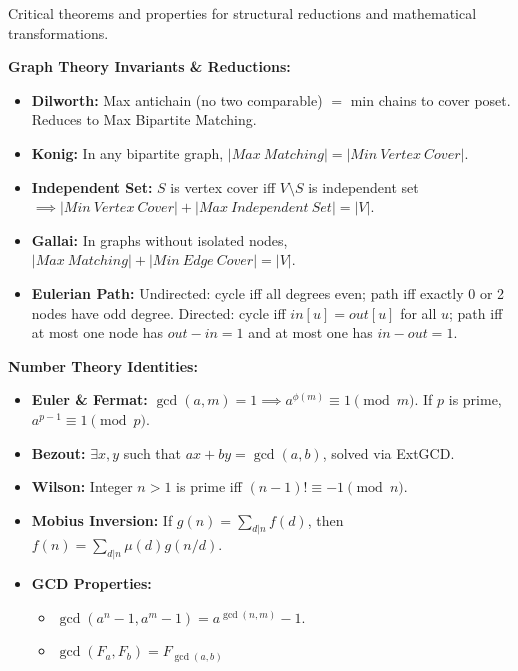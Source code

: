 
Critical theorems and properties for structural reductions and mathematical transformations.

\textbf{Graph Theory Invariants \& Reductions:}
\begin{itemize}
    \item \textbf{Dilworth:} Max antichain (no two comparable) $=$ min chains to cover poset. Reduces to Max Bipartite Matching.
    \item \textbf{Konig:} In any bipartite graph, $|Max\ Matching| = |Min\ Vertex\ Cover|$.
    \item \textbf{Independent Set:} $S$ is vertex cover iff $V \setminus S$ is independent set $\implies |Min\ Vertex\ Cover| + |Max\ Independent\ Set| = |V|$.
    \item \textbf{Gallai:} In graphs without isolated nodes, $|Max\ Matching| + |Min\ Edge\ Cover| = |V|$.
    \item \textbf{Eulerian Path:} Undirected: cycle iff all degrees even; path iff exactly 0 or 2 nodes have odd degree. Directed: cycle iff $in[u]=out[u]$ for all $u$; path iff at most one node has $out-in=1$ and at most one has $in-out=1$.
\end{itemize}

\textbf{Number Theory Identities:}
\begin{itemize}
    \item \textbf{Euler \& Fermat:} $\gcd(a, m) = 1 \implies a^{\phi(m)} \equiv 1 \pmod m$. If $p$ is prime, $a^{p-1} \equiv 1 \pmod p$.
    \item \textbf{Bezout:} $\exists x, y$ such that $ax + by = \gcd(a, b)$, solved via ExtGCD.
    \item \textbf{Wilson:} Integer $n > 1$ is prime iff $(n-1)! \equiv -1 \pmod n$.
    \item \textbf{Mobius Inversion:} If $g(n) = \sum_{d|n} f(d)$, then $f(n) = \sum_{d|n} \mu(d)g(n/d)$.
    \item \textbf{GCD Properties:} 
    \begin{itemize}
        \item $\gcd(a^n - 1, a^m - 1) = a^{\gcd(n, m)} - 1$.
        \item $\gcd(F_a, F_b) = F_{\gcd(a, b)}$
    \end{itemize}
\end{itemize}
